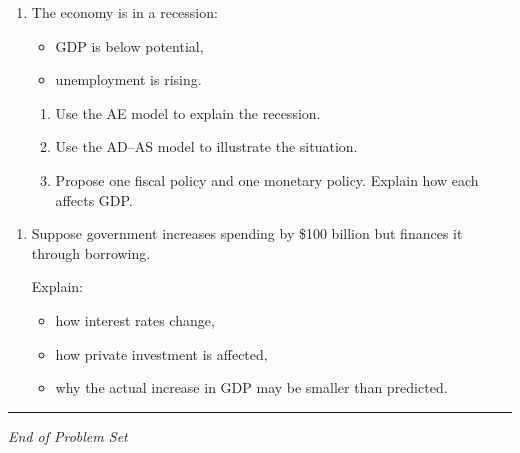 \documentclass[12pt]{article}
\begin{document}
\begin{enumerate}[label=\textbf{\arabic*.}, start=18]

\item The economy is in a recession:
\begin{itemize}
    \item GDP is below potential,
    \item unemployment is rising.
\end{itemize}

\begin{enumerate}
    \item[(a)] Use the AE model to explain the recession.
    \item[(b)] Use the AD--AS model to illustrate the situation.
    \item[(c)] Propose one fiscal policy and one monetary policy. 
    Explain how each affects GDP.
\end{enumerate}

\end{enumerate}


\begin{enumerate}[label=\textbf{\arabic*.}, start=19]

\item Suppose government increases spending by \$100 billion but finances it through borrowing.

Explain:
\begin{itemize}
    \item how interest rates change,
    \item how private investment is affected,
    \item why the actual increase in GDP may be smaller than predicted.
\end{itemize}

\end{enumerate}

\hrule
\vspace{1em}

\begin{center}
\textit{End of Problem Set}
\end{center}
\end{document}
